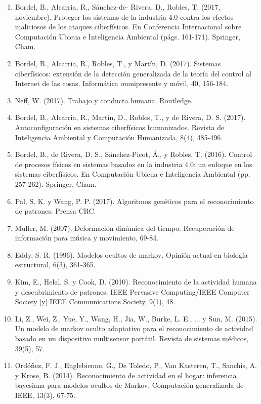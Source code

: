 \documentclass{article}
\begin{document}
\begin{enumerate}
\item Bordel, B., Alcarria, R., Sánchez-de-  Rivera, D.,  Robles, T. (2017, noviembre). Proteger los sistemas de la industria 4.0 contra los efectos maliciosos de los ataques ciberfísicos. En Conferencia Internacional sobre Computación Ubicua e Inteligencia Ambiental (págs. 161-171). Springer, Cham.
\item Bordel, B., Alcarria, R., Robles, T., y Martín, D. (2017). Sistemas ciberfísicos: extensión de la detección generalizada de la teoría del control al Internet de las cosas. Informática omnipresente y móvil, 40, 156-184.
	\item	Neff, W. (2017). Trabajo y conducta humana. Routledge.
	\item	Bordel, B., Alcarria, R., Martín, D., Robles, T., y de Rivera, D. S. (2017). Autoconfiguración en sistemas ciberfísicos humanizados. Revista de Inteligencia Ambiental y Computación Humanizada, 8(4), 485-496.
	\item	Bordel, B., de Rivera, D. S., Sánchez-Picot, Á., y Robles, T. (2016). Control de procesos físicos en sistemas basados en la industria 4.0: un enfoque en los sistemas ciberfísicos. En Computación Ubicua e Inteligencia Ambiental (pp. 257-262). Springer, Cham.
	\item	Pal, S. K. y Wang, P. P. (2017). Algoritmos genéticos para el reconocimiento de patrones. Prensa CRC.
	\item	Muller, M. (2007). Deformación dinámica del tiempo. Recuperación de información para música y movimiento, 69-84.
	\item	Eddy, S. R. (1996). Modelos ocultos de markov. Opinión actual en biología estructural, 6(3), 361-365.
	\item	Kim, E., Helal, S. y Cook, D. (2010). Reconocimiento de la actividad humana y descubrimiento de patrones. IEEE Pervasive Computing/IEEE Computer Society [y] IEEE Communications Society, 9(1), 48.
	\item	Li, Z., Wei, Z., Yue, Y., Wang, H., Jia, W., Burke, L. E., ... y Sun, M. (2015). Un modelo de markov oculto adaptativo para el reconocimiento de actividad basado en un dispositivo multisensor portátil. Revista de sistemas médicos, 39(5), 57.
	\item	Ordóñez, F. J., Englebienne, G., De Toledo, P., Van Kasteren, T., Sanchis, A. y Krose, B. (2014). Reconocimiento de actividad en el hogar: inferencia bayesiana para modelos ocultos de Markov. Computación generalizada de IEEE, 13(3), 67-75.

\end{enumerate}
\end{document}
